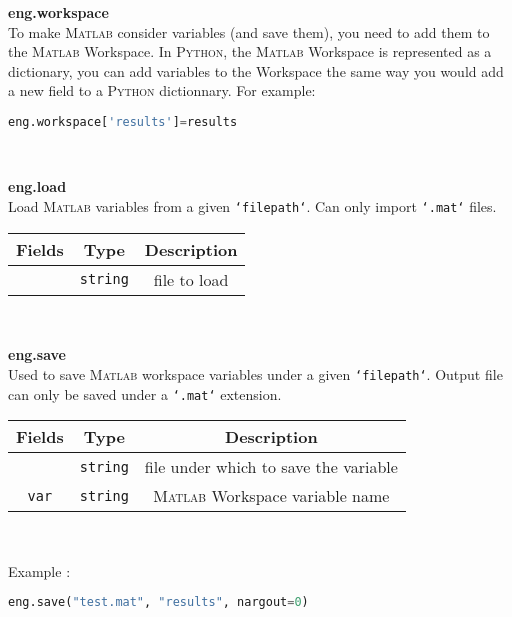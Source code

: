 \textbf{eng.workspace}\\

To make \textsc{Matlab} consider variables (and save them), you need to add them to the \textsc{Matlab} Workspace. In \textsc{Python}, the \textsc{Matlab} Workspace is represented as a dictionary, you can add variables to the Workspace the same way you would add a new field to a \textsc{Python} dictionnary. For example:

\begin{lstlisting}[language=Python]
eng.workspace['results']=results
\end{lstlisting}
\

\textbf{eng.load}\\

Load \textsc{Matlab} variables from a given {\tt `filepath`}. Can only import  {\tt `.mat`} files.

\begin{table}[ht]
    \centering
    \begin{tabular}{|>{\customfont}c|>{\customfont}c|>{\customfont}c|}
        \hline 
        \rowcolor{gray!30}
        \textbf{Fields} & \textbf{Type} & \textbf{Description}\\ \hline
        {\tt filepath} & {\tt string} & file to load \\ \hline
    \end{tabular}
\end{table}
\

\textbf{eng.save}\\

Used to save \textsc{Matlab} workspace variables under a given {\tt `filepath`}. Output file can only be saved under a {\tt `.mat`} extension.

\begin{table}[ht]
    \centering
    \begin{tabular}{|>{\customfont}c|>{\customfont}c|>{\customfont}c|}
        \hline 
        \rowcolor{gray!30}
        \textbf{Fields} & \textbf{Type} & \textbf{Description}\\ \hline
        {\tt filepath} & {\tt string} & file under which to save the variable \\ \hline
        {\tt var} & {\tt string} & \textsc{Matlab} Workspace variable name \\ \hline
    \end{tabular}
\end{table}
\

Example :

\begin{lstlisting}[language=Python]
eng.save("test.mat", "results", nargout=0)
\end{lstlisting}


